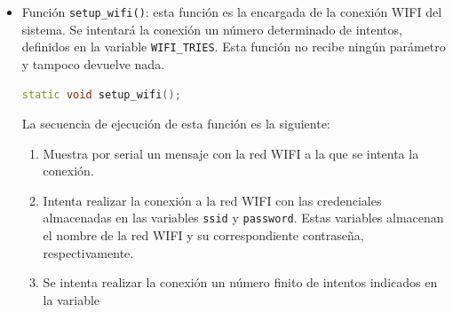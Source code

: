 \begin{itemize}
    \item Función \texttt{setup\_wifi()}: esta función es la encargada de la conexión WIFI del sistema. Se intentará la conexión un número determinado de intentos, definidos en la variable \texttt{WIFI\_TRIES}. Esta función no recibe ningún parámetro y tampoco devuelve nada.
    \begin{lstlisting}[captionpos=b, caption={Definición función setup\_wifi}, language=c++]
        static void setup_wifi();
    \end{lstlisting}
    La secuencia de ejecución de esta función es la siguiente:
    \begin{enumerate}
        \item Muestra por serial un mensaje con la red WIFI a la que se intenta la conexión.
        \item Intenta realizar la conexión a la red WIFI con las credenciales almacenadas en las variables \texttt{ssid} y \texttt{password}. Estas variables almacenan el nombre de la red WIFI y su correspondiente contraseña, respectivamente.
        \item Se intenta realizar la conexión un número finito de intentos indicados en la variable


\end{enumerate}
\end{itemize}
